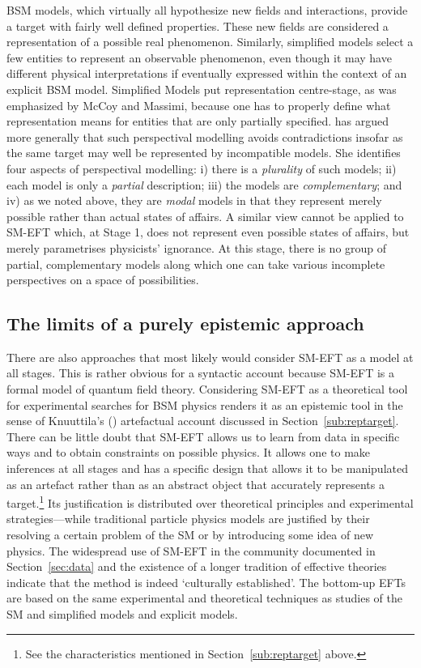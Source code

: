 BSM models, which virtually all hypothesize new fields and interactions, provide a target with fairly well defined properties. 
These new fields are considered a representation of a possible real phenomenon.
Similarly, simplified models select a few entities to represent an observable phenomenon, even though it may have different physical interpretations if eventually expressed within the context of an explicit BSM model.
Simplified Models put representation centre-stage, as was emphasized by McCoy and Massimi, because one has to properly define what representation means for entities that are only partially specified. 
\citet{massimi2018} has argued more generally that such perspectival modelling avoids contradictions insofar as the same target may well be represented by incompatible models. 
She identifies four aspects of perspectival modelling: i) there is a \textit{plurality} of such models; ii) each model is only a \textit{partial} description; iii) the models are \textit{complementary}; and iv) as we noted above, they are \textit{modal} models in that they represent merely possible rather than actual states of affairs. 
A similar view cannot be applied to SM-EFT which, at Stage 1, does not represent even possible states of affairs, but merely parametrises physicists' ignorance. 
At this stage, there is no group of partial, complementary models along which one can take various incomplete perspectives on a space of possibilities. 

\subsection{The limits of a purely epistemic approach} \label{sub:epistemic}

There are also approaches that most likely would consider SM-EFT as a model at all stages. 
This is rather obvious for a syntactic account because SM-EFT is a formal model of quantum field theory. 
Considering SM-EFT as a theoretical tool for experimental searches for BSM physics renders it as an epistemic tool in the sense of Knuuttila's (\citeyear{knuuttila2011,Knuuttila2017}) artefactual account discussed in Section~\ref{sub:reptarget}.  
There can be little doubt that SM-EFT allows us to learn from data in specific ways and to obtain constraints on possible physics.
It allows one to make inferences at all stages and has a specific design that allows it to be manipulated as an artefact rather than as an abstract object that accurately represents a target.\footnote{See the characteristics mentioned in Section~\ref{sub:reptarget} above.} 
Its justification is distributed over theoretical principles and experimental strategies---while traditional particle physics models are justified by their resolving a certain problem of the SM or by introducing some idea of new physics.
The widespread use of SM-EFT in the community documented in Section~\ref{sec:data} and the existence of a longer tradition of effective theories \citep{wells2011} indicate that the method is indeed `culturally established'. 
The bottom-up EFTs are based on the same experimental and theoretical techniques as studies of the SM and simplified models and explicit models. 

